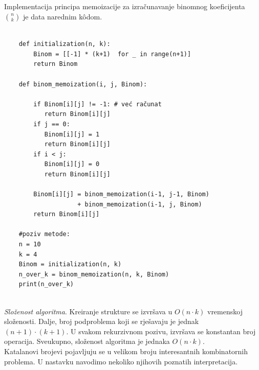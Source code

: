  Implementacija principa memoizacije za izračunavanje binomnog koefici\-jenta $\binom{n}{k}$ je data narednim k\^odom. 
  
  \begin{verbatim}
  	
  	def initialization(n, k):
  	    Binom = [[-1] * (k+1)  for _ in range(n+1)] 
  	    return Binom 
  	    
  	def binom_memoization(i, j, Binom): 
  	    
  	    if Binom[i][j] != -1: # već računat
  	       return Binom[i][j] 
  	    if j == 0: 
  	       Binom[i][j] = 1
  	       return Binom[i][j] 
  	    if i < j: 
  	       Binom[i][j] = 0 
  	       return Binom[i][j]
  	       
  	    Binom[i][j] = binom_memoization(i-1, j-1, Binom) 
  	                + binom_memoization(i-1, j, Binom) 
  	    return Binom[i][j]

    #poziv metode:
    n = 10
    k = 4
    Binom = initialization(n, k) 
    n_over_k = binom_memoization(n, k, Binom) 
    print(n_over_k)
    
  \end{verbatim}  
  
  \textit{Složenost algoritma}.  Kreiranje strukture se izvršava u $O(n\cdot k)$ vremenskoj složenosti. Dalje,  broj podproblema koji se rješavaju je jednak $(n+1) \cdot (k+1)$.  U svakom rekurzivnom pozivu, izvršava se konstantan broj operacija. Sveukupno, složenost algoritma je jednaka $O(n \cdot k)$. \\
  
  
  
  
Katalanovi brojevi pojavljuju se u velikom broju interesantnih kombinatornih problema. U nastavku navodimo nekoliko njihovih poznatih interpretacija.

